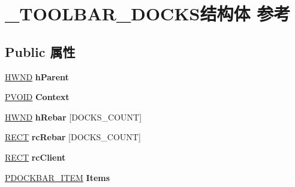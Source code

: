 \hypertarget{struct___t_o_o_l_b_a_r___d_o_c_k_s}{}\section{\+\_\+\+T\+O\+O\+L\+B\+A\+R\+\_\+\+D\+O\+C\+K\+S结构体 参考}
\label{struct___t_o_o_l_b_a_r___d_o_c_k_s}
\subsection*{Public 属性}
\begin{DoxyCompactItemize}
\item 
\mbox{\label{struct___t_o_o_l_b_a_r___d_o_c_k_s_a2a743d04d5ce78aab92397a7a2ff80c3}} 
\hyperlink{interfacevoid}{H\+W\+ND} {\bfseries h\+Parent}
\item 
\mbox{\label{struct___t_o_o_l_b_a_r___d_o_c_k_s_a40cbe04257028922f4a2219fbf1823f1}} 
\hyperlink{interfacevoid}{P\+V\+O\+ID} {\bfseries Context}
\item 
\mbox{\label{struct___t_o_o_l_b_a_r___d_o_c_k_s_af5445a9c90054448be22ee27f75b1cb7}} 
\hyperlink{interfacevoid}{H\+W\+ND} {\bfseries h\+Rebar} \mbox{[}D\+O\+C\+K\+S\+\_\+\+C\+O\+U\+NT\mbox{]}
\item 
\mbox{\label{struct___t_o_o_l_b_a_r___d_o_c_k_s_a3a085df96d1accf0f277061e25210b62}} 
\hyperlink{structtag_r_e_c_t}{R\+E\+CT} {\bfseries rc\+Rebar} \mbox{[}D\+O\+C\+K\+S\+\_\+\+C\+O\+U\+NT\mbox{]}
\item 
\mbox{\label{struct___t_o_o_l_b_a_r___d_o_c_k_s_a12b07397d5febdae4b11ca629b06296b}} 
\hyperlink{structtag_r_e_c_t}{R\+E\+CT} {\bfseries rc\+Client}
\item 
\mbox{\label{struct___t_o_o_l_b_a_r___d_o_c_k_s_a5cb5208048bc21c36bd492ed0414559f}} 
\hyperlink{struct___d_o_c_k_b_a_r___i_t_e_m}{P\+D\+O\+C\+K\+B\+A\+R\+\_\+\+I\+T\+EM} {\bfseries Items}
\item 
\mbox{\label{struct___t_o_o_l_b_a_r___d_o_c_k_s_a26960521726a78f7f18f9d6217b27bbf}} 

\end{DoxyCompactItemize}
